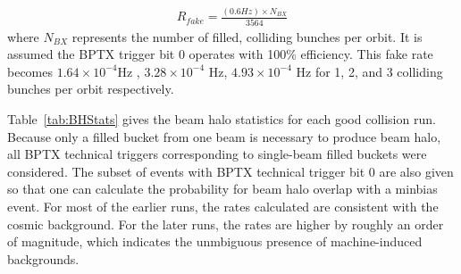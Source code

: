 \begin{eqnarray}
R_{fake} = \frac{(0.6Hz)\times N_{BX}}{3564}
\end{eqnarray}
where $N_{BX}$ represents the number of filled, colliding bunches per orbit. It is assumed the BPTX trigger bit 0 operates with 100\% efficiency.  This fake rate becomes $1.64 \times 10^{-4}$Hz , $3.28 \times 10^{-4}$ Hz, $4.93 \times 10^{-4}$ Hz for 1, 2, and 3 colliding bunches per orbit respectively. 
  
Table~\ref{tab:BHStats} gives the beam halo statistics for each good collision run. Because only a filled bucket from one beam is necessary to produce beam halo, all BPTX technical triggers corresponding to single-beam filled buckets were considered.  The subset of events with BPTX technical trigger bit 0 are also given so that one can calculate the probability for beam halo overlap with a minbias event.  For most of the earlier runs, the rates calculated are consistent with the cosmic background.  For the later runs, the rates are higher by roughly an order of magnitude, which indicates the unmbiguous presence of machine-induced backgrounds.    \\
     
